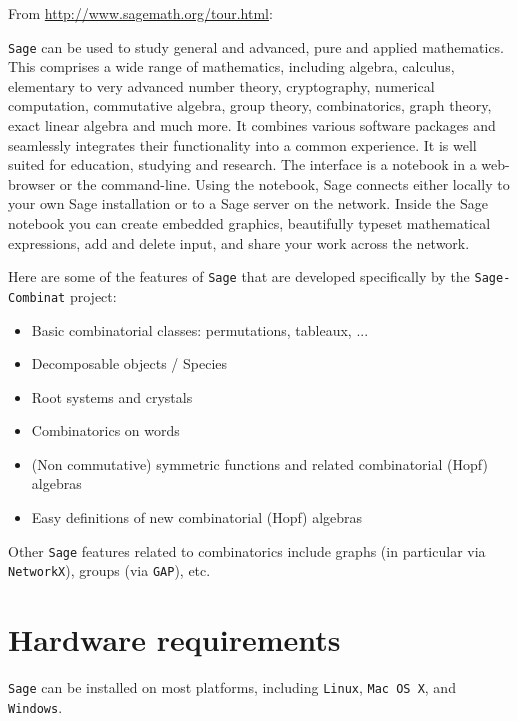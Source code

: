 \documentclass[proceedings,submission]{dmtcs}
\begin{document}
From \url{http://www.sagemath.org/tour.html}:

\texttt{Sage} can be used to study general and advanced, pure and
applied mathematics. This comprises a wide range of mathematics,
including algebra, calculus, elementary to very advanced number
theory, cryptography, numerical computation, commutative algebra,
group theory, combinatorics, graph theory, exact linear algebra and
much more. It combines various software packages and seamlessly
integrates their functionality into a common experience. It is well
suited for education, studying and research.  The interface is a
notebook in a web-browser or the command-line. Using the notebook,
Sage connects either locally to your own Sage installation or to a
Sage server on the network. Inside the Sage notebook you can create
embedded graphics, beautifully typeset mathematical expressions, add
and delete input, and share your work across the network.

Here are some of the features of \texttt{Sage} that are developed
specifically by the \texttt{Sage-Combinat} project:
\begin{itemize}
\item Basic combinatorial classes: permutations, tableaux, ...
\item Decomposable objects / Species
\item Root systems and crystals
\item Combinatorics on words
\item (Non commutative) symmetric functions and related combinatorial
  (Hopf) algebras
\item Easy definitions of new combinatorial (Hopf) algebras
\end{itemize}

Other \texttt{Sage} features related to combinatorics include graphs
(in particular via \texttt{NetworkX}), groups (via \texttt{GAP}), etc.

\section{Hardware requirements}

\texttt{Sage} can be installed on most platforms, including
\texttt{Linux}, \texttt{Mac OS X}, and \texttt{Windows}.



\end{document}

